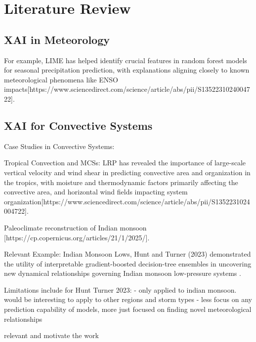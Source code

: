 \section{Literature Review}

\subsection{XAI in Meteorology}


For example, LIME has helped identify crucial features in random forest models for seasonal precipitation prediction, with explanations aligning closely to known meteorological phenomena like ENSO impacts[https://www.sciencedirect.com/science/article/abs/pii/S1352231024004722].


\subsection{XAI for Convective Systems}

Case Studies in Convective Systems:

Tropical Convection and MCSs: LRP has revealed the importance of large-scale vertical velocity and wind shear in predicting convective area and organization in the tropics, with moisture and thermodynamic factors primarily affecting the convective area, and horizontal wind fields impacting system organization[https://www.sciencedirect.com/science/article/abs/pii/S1352231024004722].

Paleoclimate reconstruction of Indian monsoon [https://cp.copernicus.org/articles/21/1/2025/].

Relevant Example: Indian Monsoon Lows, Hunt and Turner (2023) demonstrated the utility of interpretable gradient-boosted decision-tree ensembles in uncovering new dynamical relationships governing Indian monsoon low-pressure systems \citep{Hunt2024}. 

Limitations include for Hunt Turner 2023: 
- only applied to indian monsoon. would be interesting to apply to other regions and storm types
- less focus on any prediction capability of models, more just focused on finding novel meteorological relationships

relevant and motivate the work